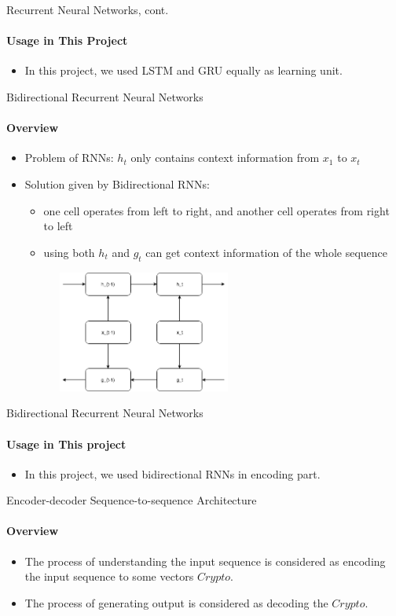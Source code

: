 \documentclass{beamer}
\begin{document}
\begin{frame}{Recurrent Neural Networks, cont.}\framesubtitle{Usage in This Project}
    \begin{itemize}
        \item In this project, we used LSTM and GRU equally as learning unit.
    \end{itemize}
\end{frame}

\begin{frame}{Bidirectional Recurrent Neural Networks}\framesubtitle{Overview }
    \begin{itemize}
        \item Problem of RNNs: $h_t$ only contains context information from $x_1$ to $x_t$
        \item Solution given by Bidirectional RNNs:
            \begin{itemize}
                \item one cell operates from left to right, and another cell operates from right to left
                \item using both $h_t$ and $g_t$ can get context information of the whole sequence
            \end{itemize}
             \begin{center}
                  \includegraphics[width=8cm, height=4cm]{figures/bidirectionalRnn.png}
            \end{center}
    \end{itemize}
\end{frame}

\begin{frame}{Bidirectional Recurrent Neural Networks}\framesubtitle{Usage in This project}
    \begin{itemize}
        \item In this project, we used bidirectional RNNs in encoding part.
    \end{itemize}
\end{frame}

\begin{frame}{Encoder-decoder Sequence-to-sequence Architecture}\framesubtitle{Overview}
\begin{itemize}
    \item The process of understanding the input sequence is considered as encoding the input sequence to some vectors $Crypto$.
    \item The process of generating output is considered as decoding the $Crypto$.
\end{itemize}



\end{frame}
\end{document}
